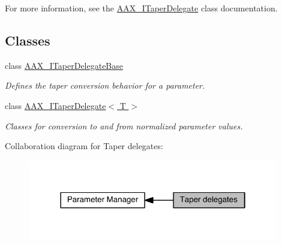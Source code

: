 For more information, see the \hyperlink{a00114}{A\+A\+X\+\_\+\+I\+Taper\+Delegate} class documentation. \subsection*{Classes}
\begin{DoxyCompactItemize}
\item 
class \hyperlink{a00115}{A\+A\+X\+\_\+\+I\+Taper\+Delegate\+Base}
\begin{DoxyCompactList}\small\item\em Defines the taper conversion behavior for a parameter. \end{DoxyCompactList}\item 
class \hyperlink{a00114}{A\+A\+X\+\_\+\+I\+Taper\+Delegate$<$ T $>$}
\begin{DoxyCompactList}\small\item\em Classes for conversion to and from normalized parameter values. \end{DoxyCompactList}\end{DoxyCompactItemize}
Collaboration diagram for Taper delegates\+:
\nopagebreak
\begin{figure}[H]
\begin{center}
\leavevmode
\includegraphics[width=310pt]{a00345}
\end{center}
\end{figure}
